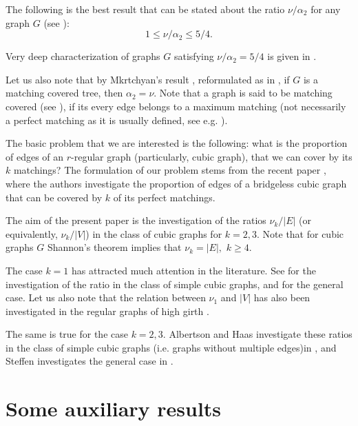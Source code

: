 \documentclass[fleqn,12pt,twoside]{article}
\begin{document}
The following is the best result that can be stated about the ratio
$\nu
/\alpha _{2}$ for any graph $G$ (see \cite{FiveFourth}):\begin{equation}
1\leq \nu /\alpha _{2}\leq 5/4.
\end{equation}

Very deep characterization of graphs $G$ satisfying $\nu /\alpha
_{2}=5/4$ is given in \cite{FivefourthCharacter}.

Let us also note that by Mkrtchyan's result \cite{MPP0-1},
reformulated as in \cite{HararyPlummer}, if $G$ is a matching
covered tree, then $\alpha
_{2}=\nu $. Note that a graph is said to be matching covered (see \cite {Perfect}), if its every edge belongs to a maximum matching (not
necessarily a perfect matching as it is usually defined, see e.g.
\cite{Lov}).

The basic problem that we are interested is the following: what is
the proportion of edges of an $r$-regular graph (particularly, cubic
graph), that we can cover by its $k$ matchings? The formulation of
our problem stems from the recent paper \cite{KaiserKralNorine},
where the authors investigate the proportion of edges of a
bridgeless cubic graph that can be covered by $k$ of its perfect
matchings.

The aim of the present paper is the investigation of the ratios $\nu
_{k}/\left\vert E\right\vert $ (or equivalently, $\nu
_{k}/\left\vert V\right\vert $) in the class of cubic graphs for $k=2,3 $. Note that for cubic graphs $G$ Shannon's theorem implies
that $\nu _{k}=\left\vert E\right\vert ,$ $k\geq 4$.

The case $k=1$ has attracted much attention in the literature. See \cite {Hobbs} for the investigation of the ratio in the class of simple
cubic graphs, and
\cite{Bella,HenningYeo,TakaoBaybars,Takao,Weinstein} for the
general case. Let us also note that the relation between $\nu _{1}$ and $\left\vert V\right\vert $ has also been investigated in the regular
graphs of high girth \cite{GirthBound}.

The same is true for the case $k=2,3$. Albertson and Haas
investigate these ratios in the class of simple cubic graphs (i.e.
graphs without multiple edges)in \cite
{AlbertsonHaasFirst,AlbertsonHaasSecond}, and Steffen investigates
the general case in \cite{Steffen}.

\section{Some auxiliary results}
\end{document}
